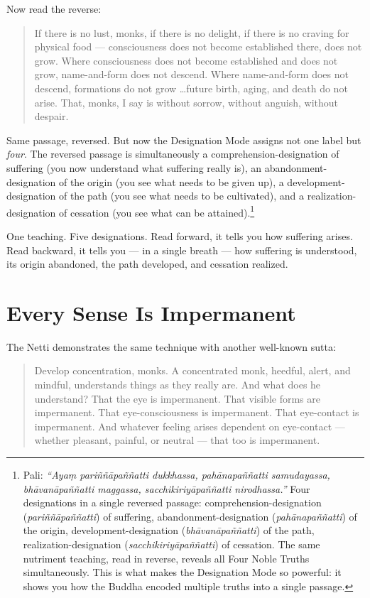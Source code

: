 Now read the reverse:

\begin{quote}
If there is no lust, monks, if there is no delight, if there is no craving for physical food --- consciousness does not become established there, does not grow. Where consciousness does not become established and does not grow, name-and-form does not descend. Where name-and-form does not descend, formations do not grow \ldots future birth, aging, and death do not arise. That, monks, I say is without sorrow, without anguish, without despair.
\end{quote}

Same passage, reversed. But now the Designation Mode assigns not one label but \textit{four}. The reversed passage is simultaneously a comprehension-designation of suffering (you now understand what suffering really is), an abandonment-designation of the origin (you see what needs to be given up), a development-designation of the path (you see what needs to be cultivated), and a realization-designation of cessation (you see what can be attained).\footnote{Pali: \textit{``Ayaṃ pariññāpaññatti dukkhassa, pahānapaññatti samudayassa, bhāvanāpaññatti maggassa, sacchikiriyāpaññatti nirodhassa.''} Four designations in a single reversed passage: comprehension-designation (\textit{pariññāpaññatti}) of suffering, abandonment-designation (\textit{pahānapaññatti}) of the origin, development-designation (\textit{bhāvanāpaññatti}) of the path, realization-designation (\textit{sacchikiriyāpaññatti}) of cessation. The same nutriment teaching, read in reverse, reveals all Four Noble Truths simultaneously. This is what makes the Designation Mode so powerful: it shows you how the Buddha encoded multiple truths into a single passage.}

One teaching. Five designations. Read forward, it tells you how suffering arises. Read backward, it tells you --- in a single breath --- how suffering is understood, its origin abandoned, the path developed, and cessation realized.

\section*{Every Sense Is Impermanent}

The Netti demonstrates the same technique with another well-known sutta:

\begin{quote}
Develop concentration, monks. A concentrated monk, heedful, alert, and mindful, understands things as they really are. And what does he understand? That the eye is impermanent. That visible forms are impermanent. That eye-consciousness is impermanent. That eye-contact is impermanent. And whatever feeling arises dependent on eye-contact --- whether pleasant, painful, or neutral --- that too is impermanent.
\end{quote}


